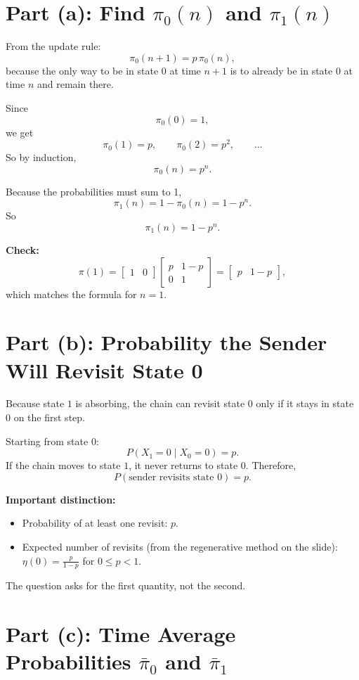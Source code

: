 \documentclass[11pt]{article}
\begin{document}
\section*{Part (a): Find \(\pi_0(n)\) and \(\pi_1(n)\)}

From the update rule:
\[
\pi_0(n+1)=p\,\pi_0(n),
\]
because the only way to be in state \(0\) at time \(n+1\) is to already be in state \(0\) at time \(n\) and remain there.

Since
\[
\pi_0(0)=1,
\]
we get
\[
\pi_0(1)=p,\qquad
\pi_0(2)=p^2,\qquad
\ldots
\]
So by induction,
\[
\boxed{\pi_0(n)=p^n.}
\]

Because the probabilities must sum to 1,
\[
\pi_1(n)=1-\pi_0(n)=1-p^n.
\]
So
\[
\boxed{\pi_1(n)=1-p^n.}
\]

\textbf{Check:}
\[
\pi(1)=
\begin{bmatrix}
1 & 0
\end{bmatrix}
\begin{bmatrix}
p & 1-p\\
0 & 1
\end{bmatrix}
=
\begin{bmatrix}
p & 1-p
\end{bmatrix},
\]
which matches the formula for \(n=1\).

\section*{Part (b): Probability the Sender Will Revisit State 0}

Because state \(1\) is absorbing, the chain can revisit state \(0\) only if it stays in state \(0\) on the first step.

Starting from state \(0\):
\[
P(X_1=0\mid X_0=0)=p.
\]
If the chain moves to state \(1\), it never returns to state \(0\). Therefore,
\[
\boxed{P(\text{sender revisits state }0)=p.}
\]

\textbf{Important distinction:}
\begin{itemize}
\item Probability of at least one revisit: \(p\).
\item Expected number of revisits (from the regenerative method on the slide): \(\eta(0)=\frac{p}{1-p}\) for \(0\le p<1\).
\end{itemize}
The question asks for the first quantity, not the second.

\section*{Part (c): Time Average Probabilities \(\bar\pi_0\) and \(\bar\pi_1\)}
\end{document}

